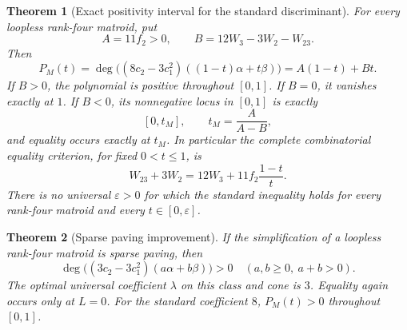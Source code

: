 \documentclass[12pt]{amsart}
\newtheorem{thm}{Theorem}[section]
\theoremstyle{definition}
\theoremstyle{remark}
\numberwithin{equation}{section}
\begin{document}
\begin{thm}[Exact positivity interval for the standard discriminant]\label{en-interval}
For every loopless rank-four matroid, put
\[
 A=11f_2>0,\qquad B=12W_3-3W_2-W_{23}.
\]
Then
\begin{equation}\label{en-linear}
 P_M(t)=\deg\bigl((8c_2-3c_1^2)((1-t)\alpha+t\beta)\bigr)
       =A(1-t)+Bt.
\end{equation}
If $B>0$, the polynomial is positive throughout $[0,1]$. If $B=0$, it vanishes exactly at $1$. If $B<0$, its nonnegative locus in $[0,1]$ is exactly
\[
 [0,t_M],\qquad t_M=\frac{A}{A-B},
\]
and equality occurs exactly at $t_M$.
In particular the complete combinatorial equality criterion, for fixed $0<t\leq1$, is
\begin{equation}\label{en-equality}
 W_{23}+3W_2=12W_3+11f_2\frac{1-t}{t}.
\end{equation}
There is no universal $\varepsilon>0$ for which the standard inequality holds for every rank-four matroid and every $t\in[0,\varepsilon]$.
\end{thm}

\begin{thm}[Sparse paving improvement]\label{en-sparse}
If the simplification of a loopless rank-four matroid is sparse paving, then
\[
 \deg\bigl((3c_2-3c_1^2)(a\alpha+b\beta)\bigr)>0
 \quad(a,b\geq0,\ a+b>0).
\]
The optimal universal coefficient $\lambda$ on this class and cone is $3$. Equality again occurs only at $L=0$. For the standard coefficient $8$, $P_M(t)>0$ throughout $[0,1]$.
\end{thm}
\end{document}
